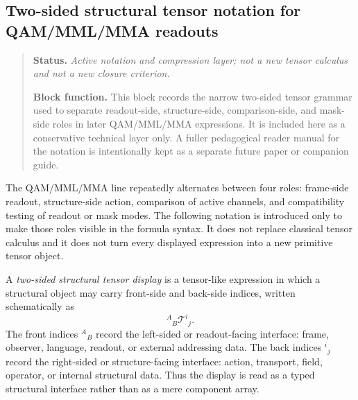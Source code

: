 \subsection*{Two-sided structural tensor notation for QAM/MML/MMA readouts}
\begin{quote}\small
\noindent\textbf{Status.} \emph{Active notation and compression layer; not a new tensor calculus and not a new closure criterion.}\par
\noindent\textbf{Block function.} This block records the narrow two-sided tensor grammar used to separate readout-side, structure-side, comparison-side, and mask-side roles in later QAM/MML/MMA expressions.  It is included here as a conservative technical layer only.  A fuller pedagogical reader manual for the notation is intentionally kept as a separate future paper or companion guide.
\end{quote}

The QAM/MML/MMA line repeatedly alternates between four roles: frame-side readout, structure-side action, comparison of active channels, and compatibility testing of readout or mask modes.  The following notation is introduced only to make those roles visible in the formula syntax.  It does not replace classical tensor calculus and it does not turn every displayed expression into a new primitive tensor object.

\begin{definition}\label{def:two-sided-structural-tensor-interface}
A \emph{two-sided structural tensor display} is a tensor-like expression in which a structural object may carry front-side and back-side indices, written schematically as
\[
{}^{A}{}_{B}\mathcal{T}^{i}{}_{j}.
\]
The front indices \({}^{A}{}_{B}\) record the left-sided or readout-facing interface: frame, observer, language, readout, or external addressing data.  The back indices \({}^{i}{}_{j}\) record the right-sided or structure-facing interface: action, transport, field, operator, or internal structural data.  Thus the display is read as a typed structural interface rather than as a mere component array.
\end{definition}

